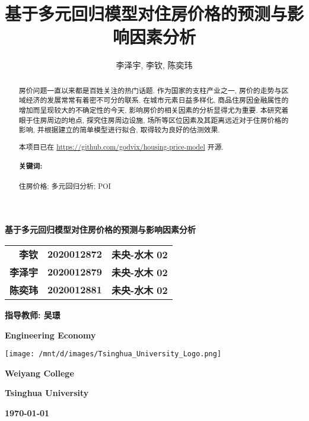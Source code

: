 \documentclass{iarticle}
\title{基于多元回归模型对住房价格的预测与影响因素分析}
\author{李泽宇, 李钦, 陈奕玮}
\begin{document}
\begin{center}
  \vspace*{1cm}

  \Huge
  \textbf{基于多元回归模型对住房价格的预测与影响因素分析}

  \vspace{0.5cm}
  \LARGE
  \textbf{}

  \vspace{1.5cm}

  \begin{tabular}{rll}
    \textbf{李钦}   & \textbf{2020012872} & \textbf{未央-水木 02} \\
    \textbf{李泽宇} & \textbf{2020012879} & \textbf{未央-水木 02} \\
    \textbf{陈奕玮} & \textbf{2020012881} & \textbf{未央-水木 02} \\
  \end{tabular}

  \vspace{1cm}

  \textbf{指导教师: \quad 吴璟}

  \vfill

  \textbf{Engineering Economy}

  \vspace{0.8cm}

  \texttt{[image: /mnt/d/images/Tsinghua\_University\_Logo.png]}

  \Large
  \textbf{Weiyang College}

  \textbf{Tsinghua University}

  \textbf{}

  \textbf{\today}

\end{center}
\newpage

\begin{abstract}
  房价问题一直以来都是百姓关注的热门话题.
  作为国家的支柱产业之一, 房价的走势与区域经济的发展常常有着密不可分的联系.
  在城市元素日益多样化, 商品住房因金融属性的增加而呈现较大的不确定性的今天, 影响房价的相关因素的分析显得尤为重要.
  本研究着眼于住房周边的地点, 探究住房周边设施, 场所等区位因素及其距离远近对于住房价格的影响, 并根据建立的简单模型进行拟合, 取得较为良好的估测效果.

  本项目已在 \url{https://github.com/godvix/housing-price-model} 开源.

  \paragraph{关键词:}
  住房价格; 多元回归分析; POI
\end{abstract}
\end{document}
